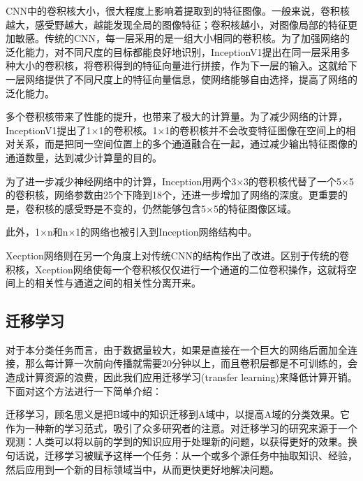 \documentclass[10.5pt,twocolumn]{jbuaa}
\begin{document}
CNN中的卷积核大小，很大程度上影响着提取到的特征图像。一般来说，卷积核越大，感受野越大，越能发现全局的图像特征；卷积核越小，对图像局部的特征更加敏感。传统的CNN，每一层采用的是一组大小相同的卷积核。为了加强网络的泛化能力，对不同尺度的目标都能良好地识别，InceptionV1提出在同一层采用多种大小的卷积核，将卷积得到的特征向量进行拼接，作为下一层的输入。这就给下一层网络提供了不同尺度上的特征向量信息，使网络能够自由选择，提高了网络的泛化能力。

多个卷积核带来了性能的提升，也带来了极大的计算量。为了减少网络的计算，InceptionV1提出了1×1的卷积核。1×1的卷积核并不会改变特征图像在空间上的相对关系，而是把同一空间位置上的多个通道融合在一起，通过减少输出特征图像的通道数量，达到减少计算量的目的。

为了进一步减少神经网络中的计算，Inception用两个3×3的卷积核代替了一个5×5的卷积核，网络参数由25个下降到18个，还进一步增加了网络的深度。更重要的是，卷积核的感受野是不变的，仍然能够包含5×5的特征图像区域。

此外，1×n和n×1的网络也被引入到Inception网络结构中。

Xecption网络则在另一个角度上对传统CNN的结构作出了改进。区别于传统的卷积核，Xception网络使每一个卷积核仅仅进行一个通道的二位卷积操作，这就将空间上的相关性与通道之间的相关性分离开来。
\subsection{迁移学习}
对于本分类任务而言，由于数据量较大，如果是直接在一个巨大的网络后面加全连接，那么每计算一次前向传播就需要20分钟以上，而且卷积层都是不可训练的，会造成计算资源的浪费，因此我们应用迁移学习(transfer learning)来降低计算开销。下面对这个方法进行一下简单介绍：

迁移学习，顾名思义是把B域中的知识迁移到A域中，以提高A域的分类效果。它作为一种新的学习范式，吸引了众多研究者的注意。对迁移学习的研究来源于一个观测：人类可以将以前的学到的知识应用于处理新的问题，以获得更好的效果。换句话说，迁移学习被赋予这样一个任务：从一个或多个源任务中抽取知识、经验，然后应用到一个新的目标领域当中，从而更快更好地解决问题。
\end{document}
